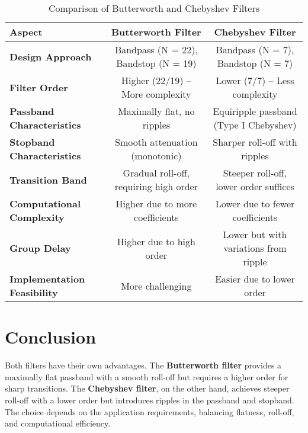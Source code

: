 \documentclass{article}
\begin{document}
\begin{table}[h]
    \centering
    \renewcommand{\arraystretch}{1.3}
    \begin{tabular}{|l|c|c|}
        \hline
        \textbf{Aspect} & \textbf{Butterworth Filter} & \textbf{Chebyshev Filter} \\
        \hline \hline
        \textbf{Design Approach} & Bandpass (N = 22), Bandstop (N = 19) & Bandpass (N = 7), Bandstop (N = 7) \\
        \hline
        \textbf{Filter Order} & Higher (22/19) – More complexity & Lower (7/7) – Less complexity \\
        \hline
        \textbf{Passband Characteristics} & Maximally flat, no ripples & Equiripple passband (Type I Chebyshev) \\
        \hline
        \textbf{Stopband Characteristics} & Smooth attenuation (monotonic) & Sharper roll-off with ripples \\
        \hline
        \textbf{Transition Band} & Gradual roll-off, requiring high order & Steeper roll-off, lower order suffices \\
        \hline
        \textbf{Computational Complexity} & Higher due to more coefficients & Lower due to fewer coefficients \\
        \hline
        \textbf{Group Delay} & Higher due to high order & Lower but with variations from ripple \\
        \hline
        \textbf{Implementation Feasibility} & More challenging & Easier due to lower order \\
        \hline
    \end{tabular}
    \caption{Comparison of Butterworth and Chebyshev Filters}
    \label{tab:comparison}
\end{table}

\section{Conclusion}
Both filters have their own advantages. The \textbf{Butterworth filter} provides a maximally flat passband with a smooth roll-off but requires a higher order for sharp transitions. The \textbf{Chebyshev filter}, on the other hand, achieves steeper roll-off with a lower order but introduces ripples in the passband and stopband. The choice depends on the application requirements, balancing flatness, roll-off, and computational efficiency.
\end{document}
